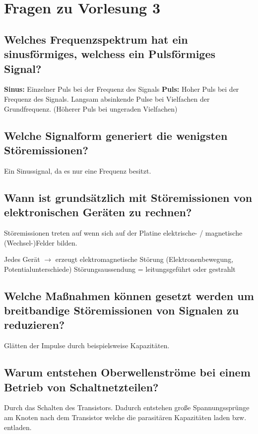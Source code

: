 \section{Fragen zu Vorlesung 3}

\subsection{Welches Frequenzspektrum hat ein sinusförmiges, welchess ein Pulsförmiges Signal?}\label{sec:lv3:freq_spekt}
\begin{outline}
  \1 \textbf{Sinus:} Einzelner Puls bei der Frequenz des Signals
  \1 \textbf{Puls:} Hoher Puls bei der Frequenz des Signals. Langsam absinkende Pulse bei Vielfachen der Grundfrequenz. (Höherer Puls bei ungeraden Vielfachen)
\end{outline}

\subsection{Welche Signalform generiert die wenigsten Störemissionen?}
Ein Sinussignal, da es nur eine Frequenz besitzt.

\subsection{Wann ist grundsätzlich mit Störemissionen von elektronischen Geräten zu rechnen?}
Störemissionen treten auf wenn sich auf der Platine elektrische- / magnetische (Wechsel-)Felder bilden.

\begin{outline}
  \1 Jedes Gerät \(\rightarrow\) erzeugt elektromagnetische Störung (Elektronenbewegung, Potentialunterschiede)
  \1 Störungsaussendung = leitungsgeführt oder gestrahlt
\end{outline}

\subsection{Welche Maßnahmen können gesetzt werden um breitbandige Störemissionen von Signalen zu reduzieren?}
Glätten der Impulse durch beispielsweise Kapazitäten.

\subsection{Warum entstehen Oberwellenströme bei einem Betrieb von Schaltnetzteilen?}
Durch das Schalten des Transistors. Dadurch entstehen große Spannungssprünge am Knoten nach dem Transistor welche die parasitären Kapazitäten laden bzw. entladen.


